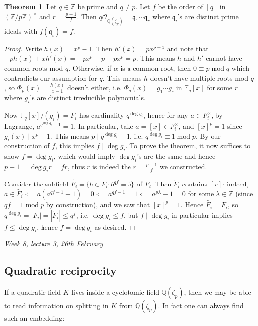 \documentclass{article}
\newcommand{\Z}{\mathbb{Z}}
\newcommand{\Q}{\mathbb{Q}}
\newcommand{\F}{\mathbb{F}}
\newcommand{\Mod}{\operatorname{mod}}
\newcommand{\ri}{\mathcal{O}}
\newcommand{\iq}{\mathfrak{q}}
\theoremstyle{definition}
\newtheorem{thm}[defn]{Theorem}
\begin{document}
\begin{thm}
Let $q\in\Z$ be prime and $q\neq p$. Let $f$ be the order of $[q]$ in $(\Z/p\Z)^\times$ and $r=\frac{p-1}{f}$. Then $q\ri_{\Q(\zeta_p)}=\iq_1\cdots\iq_r$ where $\iq_i$'s are distinct prime ideals with $f(\iq_i)=f$.
\end{thm}
\begin{proof}
Write $h(x)=x^p-1$. Then $h'(x)=px^{p-1}$ and note that $-ph(x)+xh'(x)=-px^p+p-px^p=p$. This means $h$ and $h'$ cannot have common roots mod $q$. Otherwise, if $\alpha$ is a common root, then $0\equiv p\Mod q$ which contradicts our assumption for $q$. This means $h$ doesn't have multiple roots mod $q$, so $\Phi_p(x)=\frac{h(x)}{x-1}$ doesn't either, i.e. $\overline{\Phi_p(x)}=g_1\cdots g_r$ in $\F_q[x]$ for some $r$ where $g_i$'s are distinct irreducible polynomials.

Now $\F_q[x]/(g_i)=F_i$ has cardinality $q^{\deg g_i}$, hence for any $a\in F_i^\times$, by Lagrange, $a^{q^{\deg g_i}-1}=1$. In particular, take $a=[x]\in F_i^\times$, and $[x]^p=1$ since $g_i(x)\mid x^p-1$. This means $p\mid q^{\deg g_i}-1$, i.e. $q^{\deg g_i}\equiv 1\Mod p$. By our construction of $f$, this implies $f\mid\deg g_i$. To prove the theorem, it now suffices to show $f=\deg g_i$, which would imply $\deg g_i$'s are the same and hence $p-1=\deg g_i r=fr$, thus $r$ is indeed the $r=\frac{p-1}{f}$ we constructed.

Consider the subfield $\widetilde{F_i}=\{b\in F_i:b^{qf}=b\}$ of $F_i$. Then $\widetilde{F_i}$ contains $[x]$: indeed, $a\in\widetilde{F_i}\impliedby a(a^{qf-1}-1)=0\impliedby a^{qf-1}=1\impliedby a^{p\lambda}-1=0$ for some $\lambda\in\Z$ (since $qf=1\Mod p$ by construction), and we saw that $[x]^p=1$. Hence $\widetilde{F_i}=F_i$, so $q^{\deg g_i}=|F_i|=|\widetilde{F_i}|\leq q^f$, i.e. $\deg g_i\leq f$, but $f\mid \deg g_i$ in particular implies $f\leq \deg g_i$, hence $f=\deg g_i$ as desired.
\end{proof}

\begin{flushright}
\textit{Week 8, lecture 3, 26th February}
\end{flushright}

\subsection{Quadratic reciprocity}
If a quadratic field $K$ lives inside a cyclotomic field $\Q(\zeta_p)$, then we may be able to read information on splitting in $K$ from $\Q(\zeta_p)$. In fact one can always find such an embedding:
\end{document}
